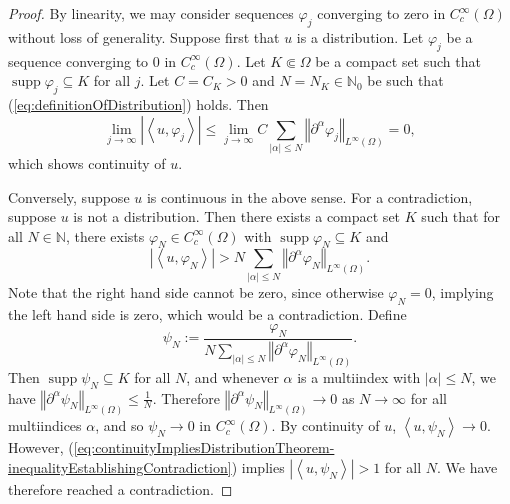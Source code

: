 \documentclass{book}
\newcommand{\bbN}{\mathbb{N}}
\renewcommand{\phi}{\varphi}
\newcommand{\abs}[1]{\left\lvert {#1} \right\rvert}
\newcommand{\norm}[1]{\left\Vert {#1} \right\Vert}
\newcommand{\angles}[1]{\left\langle {#1} \right\rangle}
\DeclareMathOperator{\supp}{supp}
\theoremstyle{definition}
\theoremstyle{remark}
\numberwithin{equation}{chapter}
\begin{document}
\begin{proof}
    By linearity, we may consider sequences $\phi_j$ converging to zero in $C_c^\infty(\Omega)$ without loss of generality. Suppose first that $u$ is a distribution. Let $\phi_j$ be a sequence converging to $0$ in $C_c^\infty(\Omega)$. Let $K \Subset \Omega$ be a compact set such that $\supp{\phi_j} \subseteq K$ for all $j$. Let $C = C_K > 0$ and $N = N_K \in \bbN_0$ be such that (\ref{eq:definitionOfDistribution}) holds. Then
    \begin{equation}
        \lim_{j \rightarrow \infty} \abs{\angles{u,\phi_j}} \leq \lim_{j \rightarrow \infty} C \sum_{\abs{\alpha} \leq N} \norm{\partial^{\alpha}\phi_j}_{L^\infty(\Omega)}                                           
                                                            =    0,
    \end{equation}
    which shows continuity of $u$.

    Conversely, suppose $u$ is continuous in the above sense. For a contradiction, suppose $u$ is not a distribution. Then there exists a compact set $K$ such that for all $N \in \bbN$, there exists $\phi_N \in C_c^\infty(\Omega)$ with $\supp{\phi_N} \subseteq K$ and
    \begin{equation} \label{eq:continuityImpliesDistributionTheorem-inequalityEstablishingContradiction}
        \abs{\angles{u,\phi_N}} > N\sum_{\abs{\alpha} \leq N} \norm{\partial^\alpha \phi_N}_{L^\infty(\Omega)}.
    \end{equation}
    Note that the right hand side cannot be zero, since otherwise $\phi_N = 0$, implying the left hand side is zero, which would be a contradiction. Define 
    \begin{equation}
        \psi_N := \frac{\phi_N}{N\sum_{\abs{\alpha} \leq N} \norm{\partial^\alpha \phi_N}_{L^\infty(\Omega)}}.
    \end{equation}
    Then $\supp{\psi_N} \subseteq K$ for all $N$, and whenever $\alpha$ is a multiindex with $\abs{\alpha} \leq N$, we have $\norm{\partial^\alpha \psi_N}_{L^\infty(\Omega)} \leq \frac{1}{N}$. Therefore $\norm{\partial^\alpha \psi_N}_{L^\infty(\Omega)} \rightarrow 0$ as $N \rightarrow \infty$ for all multiindices $\alpha$, and so $\psi_N \rightarrow 0$ in $C_c^\infty(\Omega)$. By continuity of $u$, $\angles{u,\psi_N} \rightarrow 0$. However, (\ref{eq:continuityImpliesDistributionTheorem-inequalityEstablishingContradiction}) implies $\abs{\angles{u,\psi_N}} > 1$ for all $N$. We have therefore reached a contradiction.
\end{proof}
\end{document}
